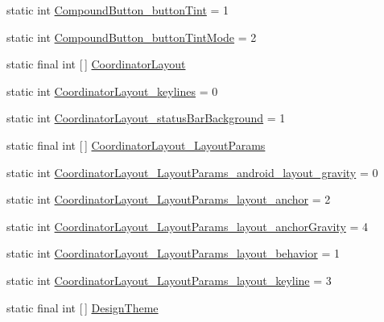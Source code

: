 \begin{DoxyCompactItemize}
\item 
static int \hyperlink{classandroid_1_1support_1_1v7_1_1mediarouter_1_1R_1_1styleable_aeb077255316e6bd00655e23b070c34fc}{Compound\+Button\+\_\+button\+Tint} = 1
\item 
static int \hyperlink{classandroid_1_1support_1_1v7_1_1mediarouter_1_1R_1_1styleable_aa96c6cd2513f203fc183a5d197e18721}{Compound\+Button\+\_\+button\+Tint\+Mode} = 2
\item 
static final int \mbox{[}$\,$\mbox{]} \hyperlink{classandroid_1_1support_1_1v7_1_1mediarouter_1_1R_1_1styleable_ae61e7ce081662158e58eb0cf6923a3cb}{Coordinator\+Layout}
\item 
static int \hyperlink{classandroid_1_1support_1_1v7_1_1mediarouter_1_1R_1_1styleable_ae86cea8b9a6e3208df0e1e6176ee9287}{Coordinator\+Layout\+\_\+keylines} = 0
\item 
static int \hyperlink{classandroid_1_1support_1_1v7_1_1mediarouter_1_1R_1_1styleable_acc0a49035b9e1de6017995e700ec83f4}{Coordinator\+Layout\+\_\+status\+Bar\+Background} = 1
\item 
static final int \mbox{[}$\,$\mbox{]} \hyperlink{classandroid_1_1support_1_1v7_1_1mediarouter_1_1R_1_1styleable_a751aa4d9918369b542c5387a38a26624}{Coordinator\+Layout\+\_\+\+Layout\+Params}
\item 
static int \hyperlink{classandroid_1_1support_1_1v7_1_1mediarouter_1_1R_1_1styleable_a6e2ae86a404cb3d13c873f2ad439780a}{Coordinator\+Layout\+\_\+\+Layout\+Params\+\_\+android\+\_\+layout\+\_\+gravity} = 0
\item 
static int \hyperlink{classandroid_1_1support_1_1v7_1_1mediarouter_1_1R_1_1styleable_a032a1c082915d23c481db8f517cb0efe}{Coordinator\+Layout\+\_\+\+Layout\+Params\+\_\+layout\+\_\+anchor} = 2
\item 
static int \hyperlink{classandroid_1_1support_1_1v7_1_1mediarouter_1_1R_1_1styleable_a22a95723a15dc3be9d3d0a5455654f10}{Coordinator\+Layout\+\_\+\+Layout\+Params\+\_\+layout\+\_\+anchor\+Gravity} = 4
\item 
static int \hyperlink{classandroid_1_1support_1_1v7_1_1mediarouter_1_1R_1_1styleable_ade4008b88df0372b323afc6e03e8ae46}{Coordinator\+Layout\+\_\+\+Layout\+Params\+\_\+layout\+\_\+behavior} = 1
\item 
static int \hyperlink{classandroid_1_1support_1_1v7_1_1mediarouter_1_1R_1_1styleable_a9ac79aa4f24497605b5aa2caad3e872c}{Coordinator\+Layout\+\_\+\+Layout\+Params\+\_\+layout\+\_\+keyline} = 3
\item 
static final int \mbox{[}$\,$\mbox{]} \hyperlink{classandroid_1_1support_1_1v7_1_1mediarouter_1_1R_1_1styleable_acb06effd66e79840e1295f063dfa8f82}{Design\+Theme}

\end{DoxyCompactItemize}
